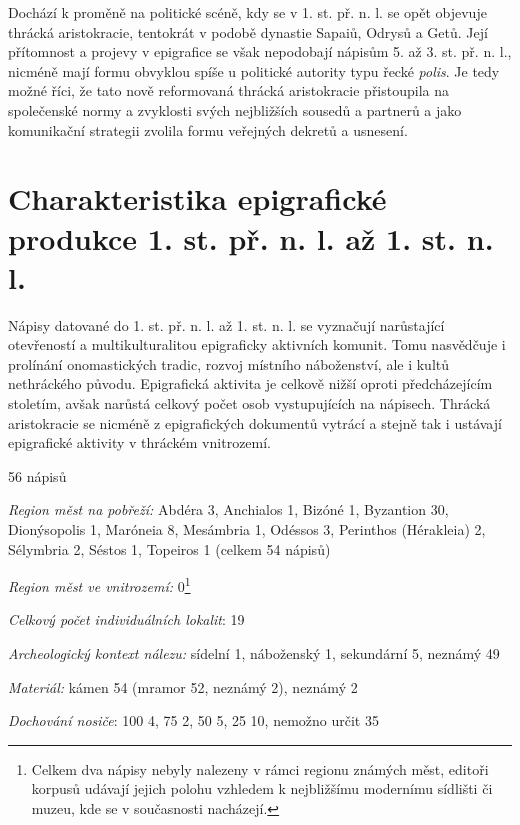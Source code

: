 Dochází k proměně na politické scéně, kdy se v 1. st. př. n. l. se opět objevuje thrácká aristokracie, tentokrát v podobě dynastie Sapaiů, Odrysů a Getů. Její přítomnost a projevy v epigrafice se však nepodobají nápisům 5. až 3. st. př. n. l., nicméně mají formu obvyklou spíše u politické autority typu řecké {\em polis}. Je tedy možné říci, že tato nově reformovaná thrácká aristokracie přistoupila na společenské normy a zvyklosti svých nejbližších sousedů a partnerů a jako komunikační strategii zvolila formu veřejných dekretů a usnesení.

\section[charakteristika-epigrafické-produkce-1.-st.-př.-n.-l.-až-1.-st.-n.-l.]{Charakteristika epigrafické produkce 1. st. př. n. l. až 1. st. n. l.}

Nápisy datované do 1. st. př. n. l. až 1. st. n. l. se vyznačují narůstající otevřeností a multikulturalitou epigraficky aktivních komunit. Tomu nasvědčuje i prolínání onomastických tradic, rozvoj místního náboženství, ale i kultů nethráckého původu. Epigrafická aktivita je celkově nižší oproti předcházejícím stoletím, avšak narůstá celkový počet osob vystupujících na nápisech. Thrácká aristokracie se nicméně z epigrafických dokumentů vytrácí a stejně tak i ustávají epigrafické aktivity v thráckém vnitrozemí.

\placetable[none]{}
\starttable[|l|]
\HL
{} 56 nápisů

{\em Region měst na pobřeží:} Abdéra 3, Anchialos 1, Bizóné 1, Byzantion 30, Dionýsopolis 1, Maróneia 8, Mesámbria 1, Odéssos 3, Perinthos (Hérakleia) 2, Sélymbria 2, Séstos 1, Topeiros 1 (celkem 54 nápisů)

{\em Region měst ve vnitrozemí:} 0\footnote{Celkem dva nápisy nebyly nalezeny v rámci regionu známých měst, editoři korpusů udávají jejich polohu vzhledem k nejbližšímu modernímu sídlišti či muzeu, kde se v současnosti nacházejí.}

{\em Celkový počet individuálních lokalit}: 19

{\em Archeologický kontext nálezu:} sídelní 1, náboženský 1, sekundární 5, neznámý 49

{\em Materiál:} kámen 54 (mramor 52, neznámý 2), neznámý 2

{\em Dochování nosiče}: 100  4, 75  2, 50  5, 25  10, nemožno určit 35

